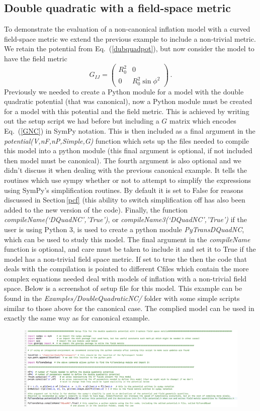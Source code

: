 \documentclass[10pt,
amsmath,amssymb,
aps,prd,nofootinbib,eqsecnum,a4paper]{revtex4}
\def\be{\begin{equation}}
\def\ee{\end{equation}}
\newcommand{\CC}{C\nolinebreak\hspace{-.05em}\raisebox{.4ex}{\tiny\bf +}\nolinebreak\hspace{-.10em}\raisebox{.4ex}{\tiny\bf +}}
\def\CC{{C\nolinebreak[4]\hspace{-.05em}\raisebox{.4ex}{\tiny\bf ++}}}
\begin{document}
\subsection{Double quadratic with a field-space metric}
\label{NCexample}
To demonstrate the evaluation of a non-canonical inflation model with a curved field-space metric 
we extend the previous example to include a non-trivial metric. 
We retain the potential from Eq.~(\ref{dubquadpot}), but now consider the model to have the field metric
\be
\label{GNC}
G_{IJ}=\left(\begin{matrix}
R_0^2 & 0\\
0 & R_0^2\sin\phi^2
\end{matrix}\right)\,.
\ee
Previously we needed to create a Python module for a model with the double quadratic potential (that was canonical),
now a Python module must be created for a model with this potential and the field metric. This is achieved by writing out the setup script we had before but including a $G$ matrix which encodes Eq.~(\ref{GNC}) in SymPy notation. 
This is then included as a final argument in the {\it potential(V,nF,nP,Simple,G)} function which sets up the files needed to compile this model 
into a python module (this final argument is optional, if not included then model must be canonical). The fourth 
argument is also optional and we didn't discuss it when dealing with the previous canonical example. It tells the routines 
which use sympy whether or not to attempt to simplify the expressions using SymPy's simplification routines. By default it is set 
to False for reasons discussed in Section\,\ref{pcf} (this ability to switch simplification off has also been added to the 
new version of the code). 
Finally, the function {\it compileName(`DQuadNC','True')}, or {\it compileName3(`DQuadNC','True')} if the user is using Python 3, is 
used to create a python module {\it PyTransDQuadNC}, which can be used to study this model. The final argument in the {\it compileName} function is optional, and care must be taken to include it and set it to True if the model has a 
non-trivial field space metric. 
If set to true the then the code that deals with the compilation is pointed to different \CC files 
which contain the more complex equations needed deal with models of inflation
with a non-trivial field space. Below is a 
screenshot of setup file for this model. This example can be found in the {\it Examples/DoubleQuadraticNC/} folder with 
some simple scripts similar to those above for the canonical case. The complied model can be used in exactly the 
same way as for canonical example.
\begin{figure}[H]
\centering
\includegraphics[width=18.0cm]{NCsetup}
\end{figure}
\end{document}
